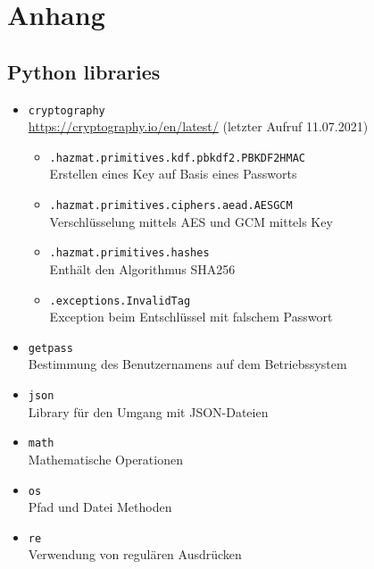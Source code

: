 \documentclass[a4paper,titlepage]{article}
\newcommand{\ilc}[1]{\textcolor{codeColor}{\texttt{#1}}}
\begin{document}

\clearpage
\section*{Anhang}
    	\renewcommand\thesubsection{Anhang \arabic{subsection}} %
   	\renewcommand\thesubsubsection{\arabic{subsection}.\arabic{subsubsection}} %
   	\setcounter{figure}{0} 
   	  
	\subsection{Python libraries} \label{libraries} %
		\begin{itemize}
			\item \ilc{cryptography} \\
				\url{https://cryptography.io/en/latest/} (letzter Aufruf 11.07.2021)
				\begin{itemize}[label={}]
				\item \ilc{.hazmat.primitives.kdf.pbkdf2.PBKDF2HMAC} \\
					Erstellen eines Key auf Basis eines Passworts
				\item \ilc{.hazmat.primitives.ciphers.aead.AESGCM} \\
					Verschlüsselung mittels AES und GCM mittels Key
				\item \ilc{.hazmat.primitives.hashes}\\
					Enthält den Algorithmus SHA256
				\item \ilc{.exceptions.InvalidTag}\\
					Exception beim Entschlüssel mit falschem Passwort 
				\end{itemize}
			\item \ilc{getpass} \\
				Bestimmung des Benutzernamens auf dem Betriebssystem
			\item \ilc{json} \\
				Library für den Umgang mit JSON-Dateien
			\item \ilc{math} \\
				Mathematische Operationen
			\item \ilc{os} \\
				Pfad und Datei Methoden
			\item \ilc{re} \\
				Verwendung von regulären Ausdrücken	

\end{itemize}
\end{document}
